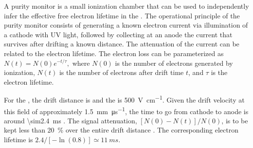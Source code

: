 A purity monitor is a small ionization chamber that can be used to independently  infer the effective free electron lifetime in the \lartpc.  The operational principle of the purity monitor consists of generating a known electron current via illumination of a cathode with UV light, followed by collecting at an anode the current that survives after drifting a known distance.  The  attenuation of the current can be related to the electron lifetime.
The electron loss can be parameterized as
%
\(N(t) = N(0)e^{-t/\tau},\)
%
where $N(0)$ is the number of electrons generated by ionization, $N(t)$ is the number of electrons after drift time $t$, and $\tau$ is the electron lifetime. 

%
%
%

For the , the 
 drift distance is \spmaxdrift and the \efield is \SI{500}{\volt\per\centi\meter}. Given the drift velocity at this field of approximately \SI{1.5}{\milli\meter\per\micro\second}, the time to go from cathode to anode is around \SI{\sim2.4}{\milli\second} \cite{Walkowiak:2000wf}.
The   signal attenuation, \([N(0)-N(t)]/N(0)\), is to be kept less than \SI{20}{\percent} over the entire drift distance \cite{fdtf-final-report}. The corresponding electron lifetime is $2.4/[-\ln(0.8)] \simeq \SI{11}{ms}$.

